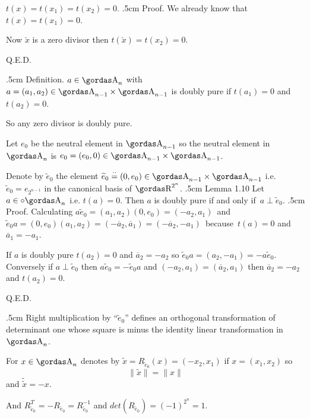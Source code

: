 $t(x)=t(x_{1})=t(x_{2})=0$.
\vglue.5cm
\noindent
{\bsbf Proof.} We already know that $t(x)=t(x_{1})=0$.
\par 
Now $\check{x}$ is a zero divisor then
$t(\check{x})=t(x_{2})=0$.
\begin{flushright}
Q.E.D.
\end{flushright}
\vglue.5cm
\noindent
{\bsbf Definition.} $a\in \a_{n}$ with $a=(a_{1},a_{2})\in \a_{n-1}\times \a_{n-1}$ is
{\bsit doubly pure} if $t(a_{1})=0$ and $t(a_{2})=0$.
\par 
So any zero divisor is doubly pure.
\par 
Let $e_{0}$ be the neutral element in $\a_{n-1}$ so the neutral element in 
$\a_{n}$ is $e_{0}=(e_{0},0)\in \a_{n-1}\times \a_{n-1}$.
\par 
Denote by $\widetilde{e}_{0}$ the element 
$\widetilde{e}_{0}\stackrel{\cdot\cdot}{=} (0,e_{0})\in \a_{n-1}\times \a_{n-1}$ i.e.
$\widetilde{e}_{0}=e_{2^{n-1}}$ in the canonical basis of $\erre^{2^n}$.
\vglue.5cm
\noindent
{\bsbf Lemma 1.10} Let $a\in \circ{\a}_{n}$ i.e. 
$t(a)=0$. Then $a$ is doubly pure if and
only if $\,a\perp \widetilde{e}_{0}$.
\vglue.5cm
\noindent
{\bsbf Proof.} Calculating 
$a\widetilde{e}_{0}=(a_{1},a_{2})(0,e_{0})=(-a_{2},a_{1})\,$ and\\
$\widetilde{e}_{0}a=(0,e_{0})(a_{1},a_{2})=(-\overline{a}_{2},\overline{a}_{1})=
(-\overline{a}_{2},-a_{1})\,$
because $\,t(a)=0$ and \\
$\overline{a}_{1}=-a_{1}$.
\par 
If $a$ is doubly pure $t(a_{2})=0$ and 
$\overline{a}_{2}=-a_{2}$ so 
$\widetilde{e}_{0}a=(a_{2},-a_{1})=-a\widetilde{e}_{0}$. Conversely if
$a\perp\widetilde{e}_{0}$ then $a\widetilde{e}_{0}=-\widetilde{e}_{0}a$ and
$(-a_{2},a_{1})=(\overline{a}_{2},a_{1})$ then
$\overline{a}_{2}=-a_{2}$ and $t(a_{2})=0$.
\begin{flushright}
Q.E.D.
\end{flushright}        
\vglue.5cm
Right multiplication by ``$\widetilde{e}_{0}$''  defines an orthogonal 
transformation of determinant one whose square is minus the identity linear 
transformation in $\a_{n}$.
\par 
For $x\in \a_{n}$ denotes by $\widetilde{x}=R_{\widetilde{e}_0}(x)=
(-x_{2},x_{1})$ if $x=(x_{1},x_{2})$ so
$$\parallel\widetilde{x}\parallel=\parallel x\parallel$$
and $\widetilde{\widetilde{x}}=-x$. 
\par 
And                      
$R^{T}_{\widetilde{e}_0}=-R_{\widetilde{e}_0}=R^{-1}_{\widetilde{e}_0}$ and 
$det(R_{\widetilde{e}_0})=(-1)^{2^n}=1$.

